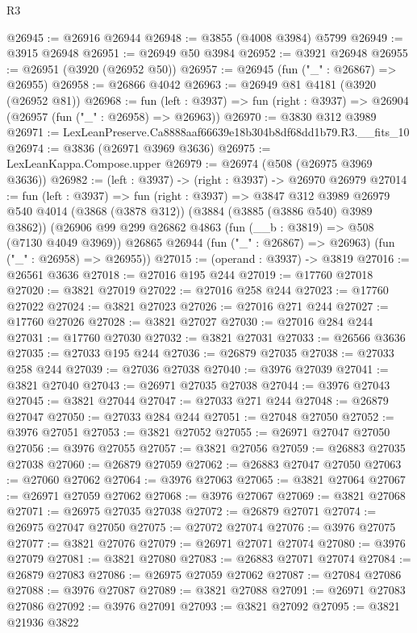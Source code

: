 \begin{lexlean}{R3}
\begin{coremodule}
@26945 := @26916 @26944
@26948 := @3855 (@4008 @3984) @5799
@26949 := @3915 @26948
@26951 := @26949 @50 @3984
@26952 := @3921 @26948
@26955 := @26951 (@3920 (@26952 @50))
@26957 := @26945 (fun ("_" : @26867) => @26955)
@26958 := @26866 @4042
@26963 := @26949 @81 @4181 (@3920 (@26952 @81))
@26968 := fun (left : @3937) =>
  fun (right : @3937) => @26904 (@26957 (fun ("_" : @26958) => @26963))
@26970 := @3830 @312 @3989
@26971 := LexLeanPreserve.Ca8888aaf66639e18b304b8df68dd1b79.R3.__fits_10
@26974 := @3836 (@26971 @3969 @3636)
@26975 := LexLeanKappa.Compose.upper
@26979 := @26974 (@508 (@26975 @3969 @3636))
@26982 := (left : @3937) -> (right : @3937) -> @26970 @26979
@27014 := fun (left : @3937) =>
  fun (right : @3937) =>
  @3847
    @312
    @3989
    @26979
    @540
    @4014
    (@3868 (@3878 @312))
    (@3884 (@3885 (@3886 @540) @3989 @3862))
    (@26906
      @99
      @299
      @26862
      @4863
      (fun (__b : @3819) => @508 (@7130 @4049 @3969))
      @26865
      @26944
      (fun ("_" : @26867) => @26963)
      (fun ("_" : @26958) => @26955))
@27015 := (operand : @3937) -> @3819
@27016 := @26561 @3636
@27018 := @27016 @195 @244
@27019 := @17760 @27018
@27020 := @3821 @27019
@27022 := @27016 @258 @244
@27023 := @17760 @27022
@27024 := @3821 @27023
@27026 := @27016 @271 @244
@27027 := @17760 @27026
@27028 := @3821 @27027
@27030 := @27016 @284 @244
@27031 := @17760 @27030
@27032 := @3821 @27031
@27033 := @26566 @3636
@27035 := @27033 @195 @244
@27036 := @26879 @27035
@27038 := @27033 @258 @244
@27039 := @27036 @27038
@27040 := @3976 @27039
@27041 := @3821 @27040
@27043 := @26971 @27035 @27038
@27044 := @3976 @27043
@27045 := @3821 @27044
@27047 := @27033 @271 @244
@27048 := @26879 @27047
@27050 := @27033 @284 @244
@27051 := @27048 @27050
@27052 := @3976 @27051
@27053 := @3821 @27052
@27055 := @26971 @27047 @27050
@27056 := @3976 @27055
@27057 := @3821 @27056
@27059 := @26883 @27035 @27038
@27060 := @26879 @27059
@27062 := @26883 @27047 @27050
@27063 := @27060 @27062
@27064 := @3976 @27063
@27065 := @3821 @27064
@27067 := @26971 @27059 @27062
@27068 := @3976 @27067
@27069 := @3821 @27068
@27071 := @26975 @27035 @27038
@27072 := @26879 @27071
@27074 := @26975 @27047 @27050
@27075 := @27072 @27074
@27076 := @3976 @27075
@27077 := @3821 @27076
@27079 := @26971 @27071 @27074
@27080 := @3976 @27079
@27081 := @3821 @27080
@27083 := @26883 @27071 @27074
@27084 := @26879 @27083
@27086 := @26975 @27059 @27062
@27087 := @27084 @27086
@27088 := @3976 @27087
@27089 := @3821 @27088
@27091 := @26971 @27083 @27086
@27092 := @3976 @27091
@27093 := @3821 @27092
@27095 := @3821 @21936 @3822

\end{coremodule}
\end{lexlean}
